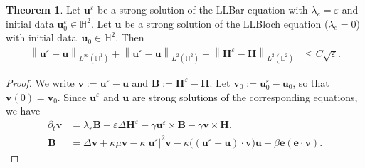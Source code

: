 \documentclass[11pt, reqno]{amsart}
\theoremstyle{definition}
\newtheorem{theorem}{Theorem}[section]
\theoremstyle{remark}
\numberwithin{equation}{section}
\newcommand{\bff}{\boldsymbol}
\newcommand{\bb}{\mathbb}
\newcommand{\ddt}{\frac{\mathrm{d}}{\mathrm{d}t}}
\newcommand{\norm}[2]{\left\|{#1}\right\|_{#2}}
\newcommand{\inpro}[2]{\left\langle#1,#2\right\rangle}
\begin{document}
\begin{theorem}\label{the:bloch to bar}
Let $\bff{u}^\varepsilon$ be a strong solution of the LLBar equation with $\lambda_e=\varepsilon$ and initial data $\bff{u}_0^\varepsilon\in \bb{H}^2$. Let $\bff{u}$ be a strong solution of the LLBloch equation ($\lambda_e=0$) with initial data~$\bff{u}_0\in \bb{H}^2$. Then
\begin{align}\label{equ:est ue u H1}
	\norm{\bff{u}^\varepsilon-\bff{u}}{L^\infty(\bb{H}^1)}
	+
	\norm{\bff{u}^\varepsilon-\bff{u}}{L^2(\bb{H}^2)}
	+
	\norm{\bff{H}^\varepsilon-\bff{H}}{L^2(\bb{L}^2)}
	&\leq
	C \sqrt{\varepsilon}.
\end{align}
\end{theorem}

\begin{proof}
We write $\bff{v}:= \bff{u}^\varepsilon-\bff{u}$ and $\bff{B}:= \bff{H}^\varepsilon-\bff{H}$. Let $\bff{v}_0:= \bff{u}_0^\varepsilon-\bff{u}_0$, so that $\bff{v}(0)=\bff{v}_0$. Since $\bff{u}^\varepsilon$ and $\bff{u}$ are strong solutions of the corresponding equations, we have
\begin{equation}\label{equ:diff v}
	\begin{aligned}
		\partial_t \bff{v}
		&=
		\lambda_r \bff{B}
		- \varepsilon \Delta \bff{H}^\varepsilon 
		- \gamma \bff{u}^\varepsilon \times \bff{B}
		- \gamma \bff{v}\times \bff{H},
		\\
		\bff{B}
		&=
		\Delta \bff{v}
		+ \kappa\mu \bff{v}
		-
		\kappa |\bff{u}^\varepsilon|^2 \bff{v}
		-
		\kappa \big( (\bff{u}^\varepsilon+\bff{u})\cdot \bff{v} \big) \bff{u}
		-
		\beta \bff{e}(\bff{e}\cdot \bff{v}).
	\end{aligned}
\end{equation}

\end{proof}
\end{document}
